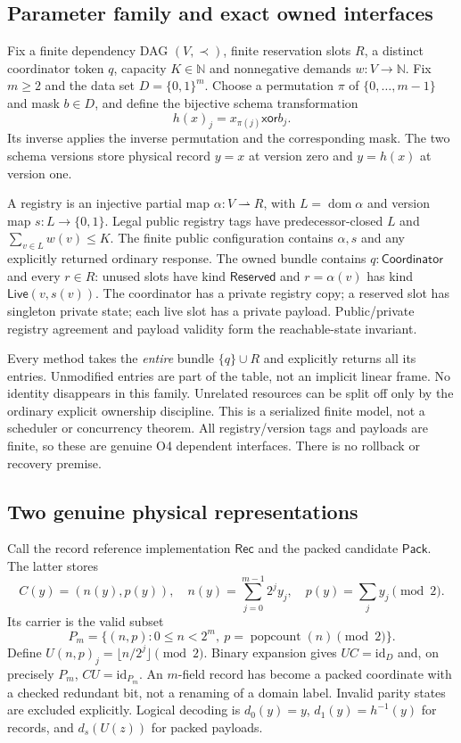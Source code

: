 \documentclass[11pt,a4paper]{article}
\theoremstyle{definition}
\newcommand{\dom}{\operatorname{dom}}
\newcommand{\id}{\mathrm{id}}
\begin{document}
\subsection{Parameter family and exact owned interfaces}
Fix a finite dependency DAG $(V,\prec)$, finite reservation slots $R$,
a distinct coordinator token $q$, capacity $K\in\mathbb N$ and
nonnegative demands $w:V\to\mathbb N$. Fix $m\geq2$ and the data set
$D=\{0,1\}^m$. Choose a permutation $\pi$ of $\{0,\ldots,m-1\}$ and
mask $b\in D$, and define the bijective schema transformation
\[
h(x)_j=x_{\pi(j)}\mathbin{\mathsf{xor}}b_j.
\]
Its inverse applies the inverse permutation and the corresponding mask.
The two schema versions store physical record $y=x$ at version zero
and $y=h(x)$ at version one.

A registry is an injective partial map $\alpha:V\rightharpoonup R$,
with $L=\dom\alpha$ and version map $s:L\to\{0,1\}$. Legal public
registry tags have predecessor-closed $L$ and
$\sum_{v\in L}w(v)\leq K$. The finite public configuration contains
$\alpha,s$ and any explicitly returned ordinary response. The owned
bundle contains $q:\mathsf{Coordinator}$ and every $r\in R$:
unused slots have kind $\mathsf{Reserved}$ and $r=\alpha(v)$ has kind
$\mathsf{Live}(v,s(v))$. The coordinator has a private registry copy;
a reserved slot has singleton private state; each live slot has a private
payload. Public/private registry agreement and payload validity form the
reachable-state invariant.

Every method takes the \emph{entire} bundle $\{q\}\cup R$ and explicitly
returns all its entries. Unmodified entries are part of the table, not
an implicit linear frame. No identity disappears in this family.
Unrelated resources can be split off only by the ordinary explicit
ownership discipline. This is a serialized finite model, not a scheduler
or concurrency theorem. All registry/version tags and payloads are finite,
so these are genuine O4 dependent interfaces. There is no rollback or
recovery premise.

\subsection{Two genuine physical representations}
Call the record reference implementation $\mathsf{Rec}$ and the packed
candidate $\mathsf{Pack}$. The latter stores
\begin{equation}\label{eq:B-codec}
C(y)=(n(y),p(y)),\quad n(y)=\sum_{j=0}^{m-1}2^jy_j,\quad
p(y)=\sum_jy_j\pmod2.
\end{equation}
Its carrier is the valid subset
\[
P_m=\{(n,p):0\leq n<2^m,\ p=\operatorname{popcount}(n)\pmod2\}.
\]
Define $U(n,p)_j=\lfloor n/2^j\rfloor\pmod2$. Binary expansion gives
$UC=\id_D$ and, on precisely $P_m$, $CU=\id_{P_m}$. An $m$-field record
has become a packed coordinate with a checked redundant bit, not a
renaming of a domain label. Invalid parity states are excluded explicitly.
Logical decoding is $d_0(y)=y$, $d_1(y)=h^{-1}(y)$ for records, and
$d_s(U(z))$ for packed payloads.
\end{document}
